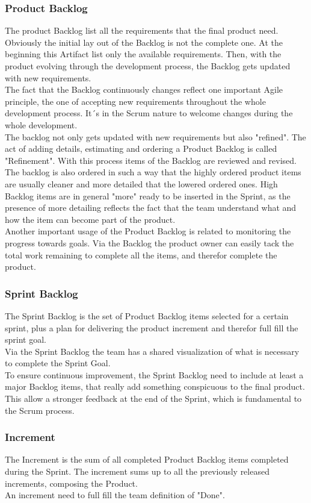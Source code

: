 \documentclass[../main.tex]{subfiles}
\begin{document}
\subsubsection{Product Backlog}
The product Backlog list all the requirements that the final product need. Obviously the initial lay out of the Backlog is not the complete one. At the beginning this Artifact list only the available requirements. Then, with the product evolving through the development process, the Backlog gets updated with new requirements.\\
The fact that the Backlog continuously changes reflect one important Agile principle, the one of accepting new requirements throughout the whole development process. It´s in the Scrum nature to welcome changes during the whole development.\\
The backlog not only gets updated with new requirements but also "refined". The act of adding details, estimating and ordering a Product Backlog is called "Refinement". With this process items of the Backlog are reviewed and revised. The backlog is also ordered in such a way that the highly ordered product items are usually cleaner and more detailed that the lowered ordered ones. High Backlog items are in general "more" ready to be inserted in the Sprint, as the presence of more detailing reflects the fact that the team understand what and how the item can become part of the product. \\
Another important usage of the Product Backlog is related to monitoring the progress towards goals. Via the Backlog the product owner can easily tack the total work remaining to complete all the items, and therefor complete the product. 
\subsubsection{Sprint Backlog}
The Sprint Backlog is the set of Product Backlog items selected for a certain sprint, plus a plan for delivering the product increment and therefor full fill the sprint goal.\\
Via the Sprint Backlog the team has a shared visualization of what is necessary to complete the Sprint Goal.\\
To ensure continuous improvement, the Sprint Backlog need to include at least a major Backlog items, that really add something conspicuous to the final product. This allow a stronger feedback at the end of the Sprint, which is fundamental to the Scrum process. 
\subsubsection{Increment}
The Increment is the sum of all completed Product Backlog items completed during the Sprint. The increment sums up to all the previously released increments, composing the Product.\\
An increment need to full fill the team definition of "Done".
\end{document}
